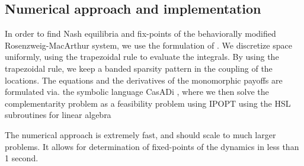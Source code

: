 \subsection*{Numerical approach and implementation}
In order to find Nash equilibria and fix-points of the behaviorally modified Rosenzweig-MacArthur system, we use the formulation of . We discretize space uniformly, using the trapezoidal rule to evaluate the integrals. By using the trapezoidal rule, we keep a banded sparsity pattern in the coupling of the locations. The equations  and the derivatives of the monomorphic payoffs  are formulated via. the symbolic language CasADi \citep{Andersson2019}, where we then solve the complementarity problem as a feasibility problem using IPOPT \citep{wachter2006implementation} using the HSL subroutines for linear algebra \citep{hsl2007collection}

The numerical approach is extremely fast, and should scale to much larger problems. It allows for determination of fixed-points of the dynamics in less than 1 second.




